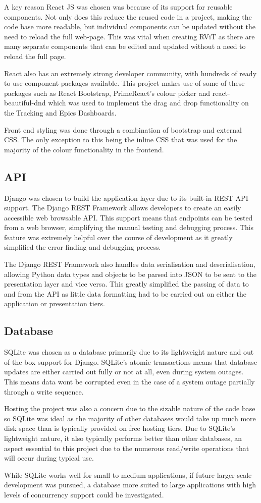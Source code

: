 \documentclass[l4proj.tex]{subfiles}
\begin{document}
A key reason React JS was chosen was because of its support for reusable components. Not only does this reduce the reused code in a project, making the code base more readable, but individual components can be updated without the need to reload the full web-page. This was vital when creating RViT as there are many separate components that can be edited and updated without a need to reload the full page. 

React also has an extremely strong developer community, with hundreds of ready to use component packages available. This project makes use of some of these packages such as React Bootstrap, PrimeReact's colour picker and react-beautiful-dnd which was used to implement the drag and drop functionality on the Tracking and Epics Dashboards.

Front end styling was done through a combination of bootstrap and external CSS. The only exception to this being the inline CSS that was used for the majority of the colour functionality in the frontend.

\subsection{API}
Django was chosen to build the application layer due to its built-in REST API support. The Django REST Framework allows developers to create an easily accessible web browsable API. This support means that endpoints can be tested from a web browser, simplifying the manual testing and debugging process. This feature was extremely helpful over the course of development as it greatly simplified the error finding and debugging process. 

The Django REST Framework also handles data serialisation and deserialisation, allowing Python data types and objects to be parsed into JSON to be sent to the presentation layer and vice versa. This greatly simplified the passing of data to and from the API as little data formatting had to be carried out on either the application or presentation tiers. 


\subsection{Database}
SQLite was chosen as a database primarily due to its lightweight nature and out of the box support for Django. SQLite's atomic transactions means that database updates are either carried out fully or not at all, even during system outages. This means data wont be corrupted even in the case of a system outage partially through a write sequence.

Hosting the project was also a concern due to the sizable nature of the code base so SQLite was ideal as the majority of other databases would take up much more disk space than is typically provided on free hosting tiers. Due to SQLite's lightweight nature, it also typically performs better than other databases, an aspect essential to this project due to the numerous read/write operations that will occur during typical use.

While SQLite works well for small to medium applications, if future larger-scale development was pursued, a database more suited to large applications with high levels of concurrency support could be investigated.
\end{document}
